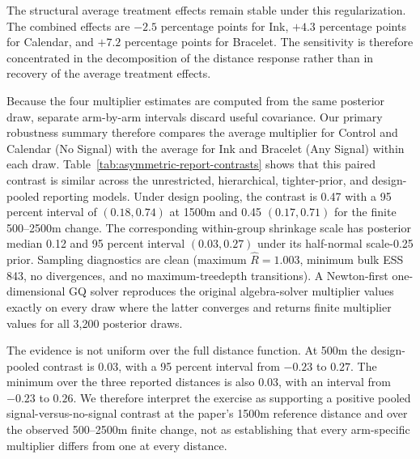 \documentclass[12pt]{article}
\begin{document}
The structural average treatment effects remain stable under this
regularization. The combined effects are $-2.5$ percentage points for Ink,
$+4.3$ percentage points for Calendar, and $+7.2$ percentage points for
Bracelet. The sensitivity is therefore concentrated in the decomposition of
the distance response rather than in recovery of the average treatment
effects.

Because the four multiplier estimates are computed from the same posterior
draw, separate arm-by-arm intervals discard useful covariance. Our primary
robustness summary therefore compares the average multiplier for Control and
Calendar (No Signal) with the average for Ink and Bracelet (Any Signal) within
each draw. Table~\ref{tab:asymmetric-report-contrasts} shows that this paired
contrast is similar across the unrestricted, hierarchical, tighter-prior, and
design-pooled reporting models. Under design pooling, the contrast is 0.47
with a 95 percent interval of $(0.18,0.74)$ at 1500m and 0.45
$(0.17,0.71)$ for the finite 500--2500m change. The corresponding within-group
shrinkage scale has posterior median 0.12 and 95 percent interval
$(0.03,0.27)$ under its half-normal scale-0.25 prior. Sampling diagnostics are
clean (maximum $\widehat R=1.003$, minimum bulk ESS 843, no divergences, and no
maximum-treedepth transitions). A Newton-first one-dimensional GQ solver
reproduces the original algebra-solver multiplier values exactly on every draw
where the latter converges and returns finite multiplier values for all 3,200
posterior draws.

The evidence is not uniform over the full distance function. At 500m the
design-pooled contrast is 0.03, with a 95 percent interval from $-0.23$ to
$0.27$. The minimum over the three reported distances is also 0.03, with an
interval from $-0.23$ to $0.26$. We therefore interpret the exercise
as supporting a positive pooled signal-versus-no-signal contrast at the
paper's 1500m reference distance and over the observed 500--2500m finite
change, not as establishing that every arm-specific multiplier differs from
one at every distance.
\end{document}
